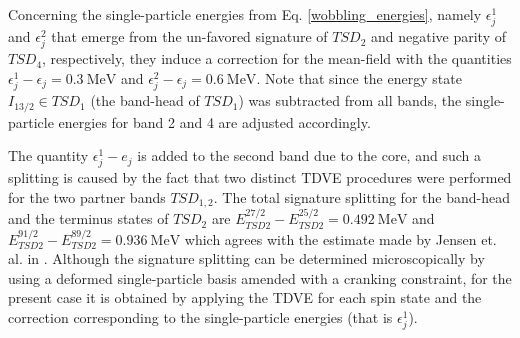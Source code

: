 \documentclass[myclassdoc,debug]{rjparticle}
\begin{document}
Concerning the single-particle energies from Eq. \ref{wobbling_energies}, namely $\epsilon_j^1$ and $\epsilon_j^2$ that emerge from the un-favored signature of $TSD_2$ and negative parity of $TSD_4$, respectively, they induce a correction for the mean-field with the quantities $\epsilon_j^1-\epsilon_j=0.3\ \text{MeV}$ and $\epsilon_j^2-\epsilon_j=0.6\ \text{MeV}$. Note that since the energy state $I_{13/2}\in TSD_1$ (the band-head of $TSD_1$) was subtracted from all bands, the single-particle energies for band 2 and 4 are adjusted accordingly.

The quantity $\epsilon_j^1-e_j$ is added to the second band due to the core, and such a splitting is caused by the fact that two distinct TDVE procedures were performed for the two partner bands $TSD_{1,2}$. The total signature splitting for the band-head and the terminus states of $TSD_2$ are $E_{TSD2}^{27/2}-E_{TSD2}^{25/2}=0.492\ \text{MeV}$ and $E_{TSD2}^{91/2}-E_{TSD2}^{89/2}=0.936\ \text{MeV}$ which agrees with the estimate made by Jensen et. al. in \cite{jensen2002wobbling}. Although the signature splitting can be determined microscopically by using a deformed single-particle basis amended with a cranking constraint, for the present case it is obtained by applying the TDVE for each spin state and the correction corresponding to the single-particle energies (that is $\epsilon_j^1$).
\end{document}
